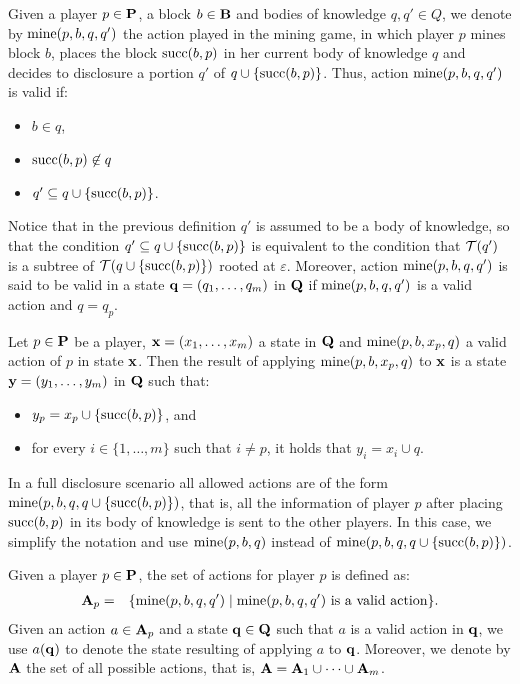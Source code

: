 \documentclass{article}
\begin{document}
Given a player $p \in \mathbf{P}$, a block $b \in \mathbf{B}$ and bodies of knowledge $q, q' \in Q$, we denote by $\text{mine}(p,b,q,q')$ the action played in the mining game, in which player $p$ mines block $b$, places the block $\text{succ}(b,p)$ in her current body of knowledge $q$ and decides to disclosure a portion $q'$ of $q \cup \{\text{succ}(b,p)\}$. Thus, action $\text{mine}(p,b,q,q')$ is valid if:
\begin{itemize}

\item $b \in q$,


\item $\text{succ}(b,p) \not\in q$

\item $q' \subseteq q \cup \{\text{succ}(b,p)\}$.
\end{itemize}
Notice that in the previous definition $q'$ is assumed to be a body of knowledge, so that the condition $q' \subseteq q \cup \{\text{succ}(b,p)\}$ is equivalent to the condition that $\mathcal{T}(q')$ is a subtree of $\mathcal{T}(q \cup \{\text{succ}(b,p)\})$ rooted at $\varepsilon$. Moreover, action $\text{mine}(p,b,q,q')$ is said to be valid in a state $\mathbf{q} = (q_1, \ldots, q_m)$ in $\mathbf{Q}$ if $\text{mine}(p,b,q,q')$ is a valid action and $q = q_p$.

Let $p \in \mathbf{P}$ be a player, $\mathbf{x} =  (x_1, \ldots, x_m)$ a state in $\mathbf{Q}$ and $\text{mine}(p,b,x_p,q)$ a valid action of $p$ in state $\mathbf{x}$. Then the result of applying $\text{mine}(p,b,x_p,q)$ to $\mathbf{x}$ is a state $\mathbf{y} = (y_1, \ldots, y_m)$ in $\mathbf{Q}$ such that:
\begin{itemize}
\item $y_p = x_p \cup \{\text{succ}(b,p)\}$, and

\item for every $i \in \{1, \ldots, m\}$ such that $i \neq p$, it holds that $y_i = x_i \cup q$.
\end{itemize}
In a full disclosure scenario all allowed actions are of the form $\text{mine}(p,b,q,q \cup \{\text{succ}(b,p)\})$, that is, all the information of player $p$ after placing $\text{succ}(b,p)$ in its body of knowledge is sent to the other players. In this case, we simplify the notation and use $\text{mine}(p,b,q)$ instead of $\text{mine}(p,b,q,q\cup \{\text{succ}(b,p)\})$.

Given a player $p \in \mathbf{P}$, the set of actions for player $p$ is defined as:
\begin{eqnarray*}
\mathbf{A}_p & = & \{ \text{mine}(p,b,q,q') \mid \text{mine}(p,b,q,q') \text{ is a valid action}\}.
\end{eqnarray*}
Given an action $a \in \mathbf{A}_p$ and a state $\mathbf{q} \in \mathbf{Q}$ such that $a$ is a valid action in $\mathbf{q}$, we use $a(\mathbf{q})$ to denote the state resulting of applying $a$ to $\mathbf{q}$. Moreover, we denote by $\mathbf{A}$ the set of all possible actions, that is, $\mathbf{A} = \mathbf{A}_1 \cup \cdots \cup \mathbf{A}_m$.
\end{document}
